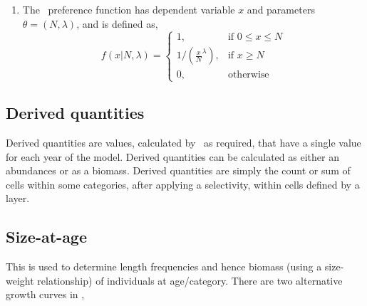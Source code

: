 \begin{enumerate}
\item The \ preference function has dependent variable $x$ and parameters $\theta = (N,\lambda)$, and is defined as,
\begin{equation}
  f(x | N, \lambda) = \begin{cases}
    1, & \text{if $0 \le x \leq N$} \\
    1/\left({\frac{x}{N}}^\lambda\right), & \text{if $x \ge N$}\\
    0, & \text{otherwise}
  \end{cases}
\end{equation}

\end{enumerate}

\subsection{Derived quantities\label{sec:derived-quantities}}

Derived quantities are values, calculated by \SPM\ as required, that have a single value for each year of the model. Derived quantities can be calculated as either an abundances or as a biomass. Derived quantities are simply the count or sum of cells within some categories, after applying a selectivity, within cells defined by a layer.

\subsection{Size-at-age\label{sec:size-at-age}}

This is used to determine length frequencies and hence biomass (using a size-weight relationship) of individuals at age/category. There are two alternative growth curves in \SPM, 

